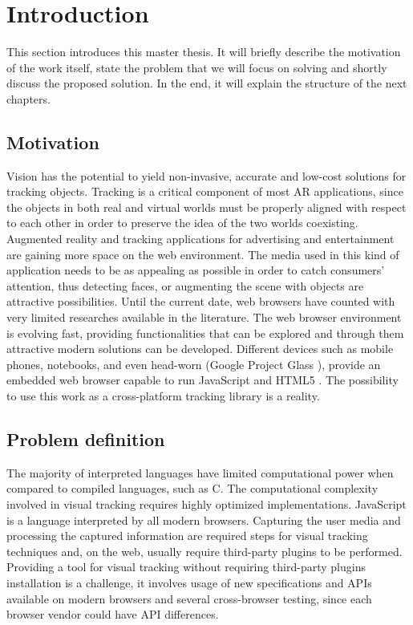 \chapter{Introduction} %
\label{cha:introduction}

This section introduces this master thesis. It will briefly describe the motivation of the work itself, state the problem that we will focus on solving and shortly discuss the proposed solution. In the end, it will explain the structure of the next chapters.

\section{Motivation} %
\label{sec:introduction:motivation}

Vision has the potential to yield non-invasive, accurate and low-cost solutions for tracking objects. Tracking is a critical component of most AR applications, since the objects in both real and virtual worlds must be properly aligned with respect to each other in order to preserve the idea of the two worlds coexisting. Augmented reality and tracking applications for advertising and entertainment are gaining more space on the web environment. The media used in this kind of application needs to be as appealing as possible in order to catch consumers' attention, thus detecting faces, or augmenting the scene with objects are attractive possibilities. Until the current date, web browsers have counted with very limited researches available in the literature. The web browser environment is evolving fast, providing functionalities that can be explored and through them attractive modern solutions can be developed. Different devices such as mobile phones, notebooks, and even head-worn \cite{Benford1998} (Google Project Glass \cite{Glass2013}), provide an embedded web browser capable to run JavaScript and HTML5 \cite{International2009,Hickson2013}. The possibility to use this work as a cross-platform tracking library is a reality.


\section{Problem definition} %
\label{sec:introduction:problem_definition}

The majority of interpreted languages have limited computational power when compared to compiled languages, such as C. The computational complexity involved in visual tracking requires highly optimized implementations. JavaScript \cite{International2009}  is a language interpreted by all modern browsers. Capturing the user media and processing the captured information are required steps for visual tracking techniques and, on the web, usually require third-party plugins to be performed. Providing a tool for visual tracking without requiring third-party plugins installation is a challenge, it involves usage of new specifications and APIs available on modern browsers and several cross-browser testing, since each browser vendor could have API differences.

